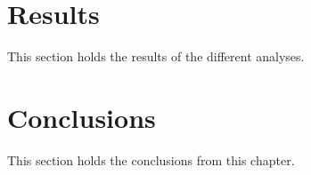 \section{Results}

This section holds the results of the different analyses.

\section{Conclusions}

This section holds the conclusions from this chapter.
